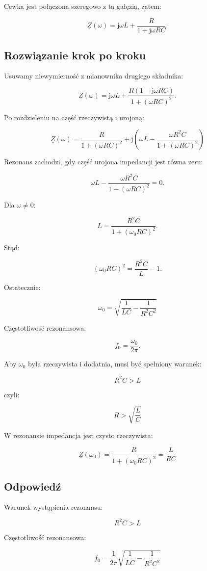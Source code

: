\documentclass[12pt,a4paper]{article}
\newcommand{\jw}{\mathrm{j}\omega}
\newcommand{\Z}{\underline{Z}}
\begin{document}
Cewka jest połączona szeregowo z tą gałęzią, zatem:

\[
\Z(\omega)
=
\jw L+\frac{R}{1+\jw RC}.
\]

\subsection*{Rozwiązanie krok po kroku}

Usuwamy niewymierność z mianownika drugiego składnika:

\[
\Z(\omega)
=
\jw L+
\frac{R(1-\jw RC)}
{1+(\omega RC)^2}.
\]

Po rozdzieleniu na część rzeczywistą i urojoną:

\[
\boxed{
\Z(\omega)=
\frac{R}{1+(\omega RC)^2}
+
\mathrm{j}
\left(
\omega L-
\frac{\omega R^2C}
{1+(\omega RC)^2}
\right)
}
\]

Rezonans zachodzi, gdy część urojona impedancji jest równa zeru:

\[
\omega L-
\frac{\omega R^2C}
{1+(\omega RC)^2}=0.
\]

Dla $\omega\neq0$:

\[
L=
\frac{R^2C}
{1+(\omega_0RC)^2}.
\]

Stąd:

\[
(\omega_0RC)^2=
\frac{R^2C}{L}-1.
\]

Ostatecznie:

\[
\boxed{
\omega_0=
\sqrt{
\frac{1}{LC}
-
\frac{1}{R^2C^2}
}
}
\]

Częstotliwość rezonansowa:

\[
f_0=\frac{\omega_0}{2\pi}.
\]

Aby $\omega_0$ była rzeczywista i dodatnia, musi być spełniony warunek:

\[
\boxed{R^2C>L}
\]

czyli:

\[
\boxed{R>\sqrt{\frac{L}{C}}}
\]

W rezonansie impedancja jest czysto rzeczywista:

\[
\boxed{
\Z(\omega_0)=
\frac{R}{1+(\omega_0RC)^2}
=
\frac{L}{RC}
}
\]

\subsection*{Odpowiedź}

Warunek wystąpienia rezonansu:

\[
\boxed{R^2C>L}
\]

Częstotliwość rezonansowa:

\[
\boxed{
f_0=
\frac{1}{2\pi}
\sqrt{
\frac{1}{LC}
-
\frac{1}{R^2C^2}
}
}
\]
\end{document}
